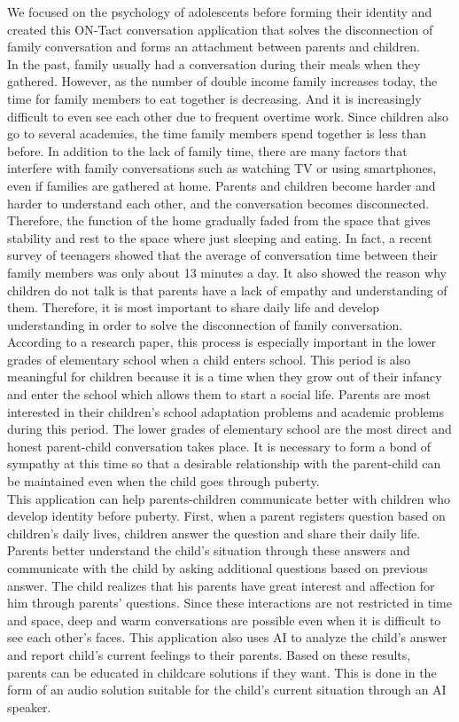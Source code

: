 \documentclass[conference]{IEEEtran}
\begin{document}
We focused on the psychology of adolescents before forming their identity and created this ON-Tact conversation application that solves the disconnection of family conversation and forms an attachment between parents and children.
\\
In the past, family usually had a conversation during their meals when they gathered. However, as the number of double income family increases today, the time for family members to eat together is decreasing. And it is increasingly difficult to even see each other due to frequent overtime work. Since children also go to several academies, the time family members spend together is less than before. In addition to the lack of family time, there are many factors that interfere with family conversations such as watching TV or using smartphones, even if families are gathered at home. Parents and children become harder and harder to understand each other, and the conversation becomes disconnected. Therefore, the function of the home gradually faded from the space that gives stability and rest to the space where just sleeping and eating. In fact, a recent survey of teenagers showed that the average of conversation time between their family members was only about 13 minutes a day. It also showed the reason why children do not talk is that parents have a lack of empathy and understanding of them. Therefore, it is most important to share daily life and develop understanding in order to solve the disconnection of family conversation.
\\
According to a research paper, this process is especially important in the lower grades of elementary school when a child enters school. This period is also meaningful for children because it is a time when they grow out of their infancy and enter the school which allows them to start a social life. Parents are most interested in their children's school adaptation problems and academic problems during this period. The lower grades of elementary school are the most direct and honest parent-child conversation takes place. It is necessary to form a bond of sympathy at this time so that a desirable relationship with the parent-child can be maintained even when the child goes through puberty. 
\\
This application can help parents-children communicate better with children who develop identity before puberty. First, when a parent registers question based on children's daily lives, children answer the question and share their daily life. Parents better understand the child's situation through these answers and communicate with the child by asking additional questions based on previous answer. The child realizes that his parents have great interest and affection for him through parents' questions. Since these interactions are not restricted in time and space, deep and warm conversations are possible even when it is difficult to see each other's faces. This application also uses AI to analyze the child's answer and report child’s current feelings to their parents. Based on these results, parents can be educated in childcare solutions if they want. This is done in the form of an audio solution suitable for the child's current situation through an AI speaker. 
\end{document}

